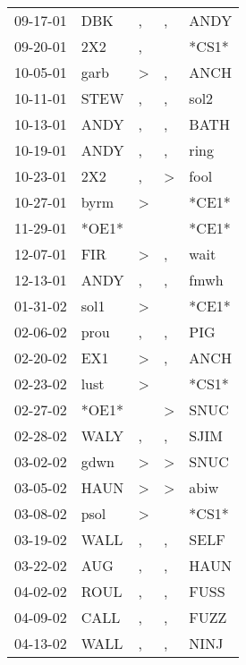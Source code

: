 \begin{supertabular}{lllll}
 09-17-01 &    DBK &             , &                , &   ANDY \\
 09-20-01 &    2X2 &             , &                  &  *CS1* \\
 10-05-01 &   garb &  \textgreater &                , &   ANCH \\
 10-11-01 &   STEW &             , &                , &   sol2 \\
 10-13-01 &   ANDY &             , &                , &   BATH \\
 10-19-01 &   ANDY &             , &                , &   ring \\
 10-23-01 &    2X2 &             , &     \textgreater &   fool \\
 10-27-01 &   byrm &  \textgreater &                  &  *CE1* \\
 11-29-01 &  *OE1* &               &                  &  *CE1* \\
 12-07-01 &    FIR &  \textgreater &                , &   wait \\
 12-13-01 &   ANDY &             , &                , &   fmwh \\
 01-31-02 &   sol1 &  \textgreater &                  &  *CE1* \\
 02-06-02 &   prou &             , &                , &    PIG \\
 02-20-02 &    EX1 &  \textgreater &                , &   ANCH \\
 02-23-02 &   lust &  \textgreater &                  &  *CS1* \\
 02-27-02 &  *OE1* &               &     \textgreater &   SNUC \\
 02-28-02 &   WALY &             , &                , &   SJIM \\
 03-02-02 &   gdwn &  \textgreater &     \textgreater &   SNUC \\
 03-05-02 &   HAUN &  \textgreater &     \textgreater &   abiw \\
 03-08-02 &   psol &  \textgreater &                  &  *CS1* \\
 03-19-02 &   WALL &             , &                , &   SELF \\
 03-22-02 &    AUG &             , &                , &   HAUN \\
 04-02-02 &   ROUL &             , &                , &   FUSS \\
 04-09-02 &   CALL &             , &                , &   FUZZ \\
 04-13-02 &   WALL &             , &                , &   NINJ \\

\end{supertabular}
